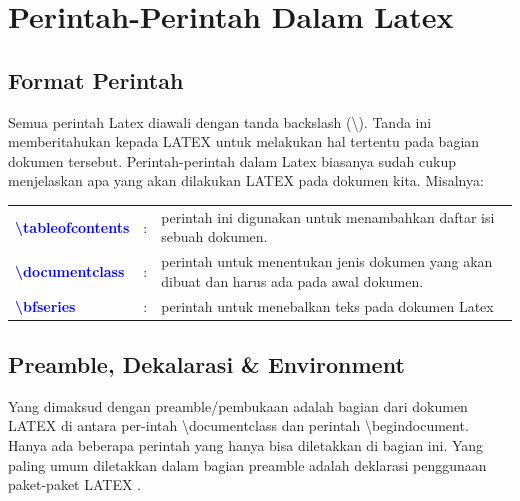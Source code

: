 \section{Perintah-Perintah Dalam  Latex}
\subsection{Format Perintah}
\begin{raggedleft}
Semua perintah Latex diawali dengan tanda backslash (\textbackslash). Tanda ini memberitahukan kepada LATEX untuk melakukan hal tertentu pada bagian dokumen tersebut. Perintah-perintah dalam Latex biasanya sudah cukup menjelaskan apa yang akan dilakukan LATEX pada dokumen kita. Misalnya:\end{raggedleft}
\begin{table}[h!]
\begin{tabular}{ll p{5 cm}}
\bfseries{\textcolor{blue}{\textbackslash tableofcontents}} &:& perintah ini digunakan untuk menambahkan daftar isi sebuah   dokumen.\\
\bfseries{\textcolor{blue}{\textbackslash documentclass}} & :& perintah untuk menentukan jenis dokumen yang akan dibuat  dan harus ada pada awal  dokumen. \\
\bfseries{\textcolor{blue}{\textbackslash bfseries}}&:& perintah untuk menebalkan teks pada dokumen Latex
\end{tabular}
\end{table}
\subsection{Preamble, Dekalarasi \& Environment}
\begin{raggedleft}Yang dimaksud dengan preamble/pembukaan adalah bagian dari dokumen LATEX di antara per-intah \textbackslash  documentclass dan perintah \textbackslash begin{document}. Hanya ada beberapa perintah yang hanya bisa diletakkan di bagian ini. Yang paling umum diletakkan dalam bagian preamble adalah deklarasi penggunaan paket-paket LATEX .\end{raggedleft}
